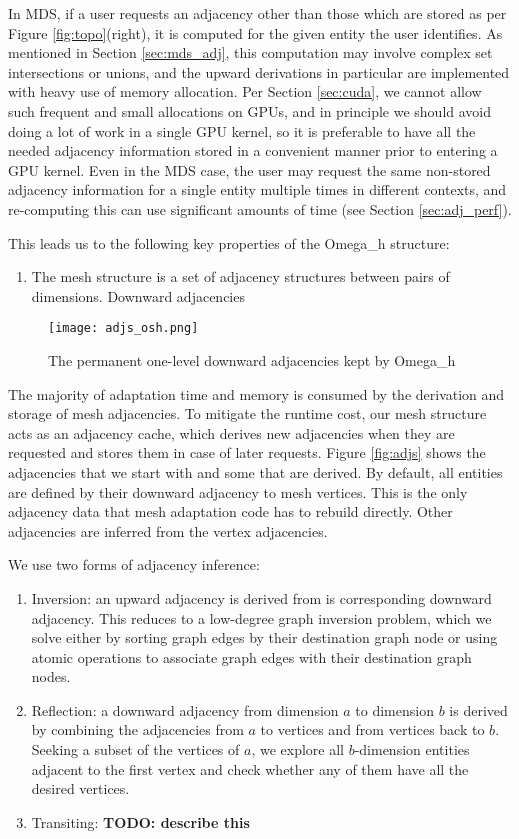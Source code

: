 In MDS, if a user requests an adjacency other than those
which are stored as per Figure \ref{fig:topo}(right),
it is computed for the given entity the user identifies.
As mentioned in Section \ref{sec:mds_adj}, this computation
may involve complex set intersections or unions, and the
upward derivations in particular are implemented with
heavy use of memory allocation.
Per Section \ref{sec:cuda}, we cannot allow such frequent
and small allocations on GPUs, and in principle we should
avoid doing a lot of work in a single GPU kernel, so it
is preferable to have all the needed adjacency information stored in
a convenient manner prior to entering a GPU kernel.
Even in the MDS case, the user may request the same non-stored
adjacency information for a single entity multiple times
in different contexts, and re-computing this can use significant
amounts of time (see Section \ref{sec:adj_perf}).

This leads us to the following key properties of the Omega\_h structure:
\begin{enumerate}
\item The mesh structure is a set of adjacency structures between
pairs of dimensions. Downward adjacencies 
\end{enumerate}

\begin{figure}
\begin{center}
\texttt{[image: adjs\_osh.png]}
\caption{The permanent one-level downward adjacencies
kept by Omega\_h}
\label{fig:adjs_osh}
\end{center}
\end{figure}

The majority of adaptation time and memory is consumed by the
derivation and storage of mesh adjacencies.
To mitigate the runtime cost, our mesh structure acts as an adjacency cache,
which derives new adjacencies when they are requested and stores
them in case of later requests.
Figure \ref{fig:adjs} shows the adjacencies that we start with and some
that are derived.
By default, all entities are defined by their downward adjacency to mesh vertices.
This is the only adjacency data that mesh adaptation code has to rebuild
directly.
Other adjacencies are inferred from the vertex adjacencies.

We use two forms of adjacency inference:
\begin{enumerate}
\item Inversion: an upward adjacency is derived from is corresponding downward
adjacency. This reduces to a low-degree graph inversion problem, which we
solve either by sorting graph edges by their destination graph node or using
atomic operations to associate graph edges with their destination graph nodes.
\item Reflection: a downward adjacency from dimension $a$ to dimension $b$
is derived by combining the adjacencies from $a$ to vertices and from
vertices back to $b$.
Seeking a subset of the vertices of $a$, we explore all $b$-dimension entities
adjacent to the first vertex and check whether any of them have all the
desired vertices.
\item Transiting: {\bf TODO: describe this}
\end{enumerate}

